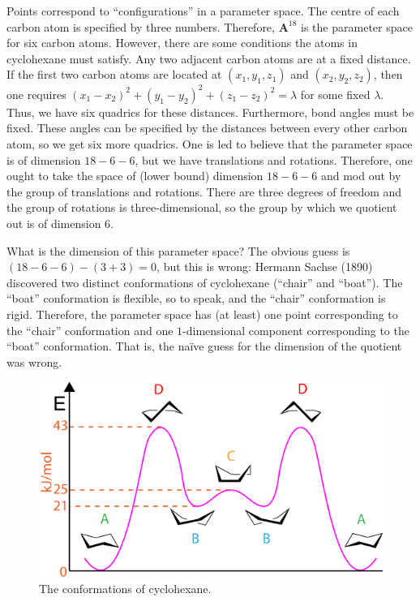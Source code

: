 \documentclass [11 pt, oneside] {article}
\begin{document}
\begin{example}\label{}
Points correspond to ``configurations'' in a parameter space. The centre of each carbon atom is specified by three numbers. Therefore, $\mathbf{A}^{18}$ is the parameter space for six carbon atoms. However, there are some conditions the atoms in cyclohexane must satisfy. Any two adjacent carbon atoms are at a fixed distance. If the first two carbon atoms are located at $(x_1,y_1,z_1)$ and $(x_2,y_2,z_2)$, then one requires $(x_1-x_2)^2 + (y_1-y_2)^2 + (z_1-z_2)^2=\lambda$ for some fixed $\lambda$. Thus, we have six quadrics for these distances. Furthermore, bond angles must be fixed. These angles can be specified by the distances between every other carbon atom, so we get six more quadrics. One is led to believe that the parameter space is of dimension $18-6-6$, but we have translations and rotations. Therefore, one ought to take the space of (lower bound) dimension $18-6-6$ and mod out by the group of translations and rotations. There are three degrees of freedom and the group of rotations is three-dimensional, so the group by which we quotient out is of dimension $6$. 

What is the dimension of this parameter space? The obvious guess is $ (18-6-6) - (3+3)=0$, but this is wrong: Hermann Sachse (1890) discovered two distinct conformations of cyclohexane (``chair'' and ``boat''). The ``boat'' conformation is flexible, so to speak, and the ``chair'' conformation is rigid. Therefore, the parameter space has (at least) one point corresponding to the ``chair'' conformation and one $1$-dimensional component corresponding to the ``boat'' conformation. That is, the na\"ive guess for the dimension of the quotient was wrong.
\end{example}
\iffalse
\begin{figure}
	\begin{center}
		\includegraphics[scale=0.5]{images/cyclohexane_conformations}
		\caption{The conformations of cyclohexane.}
	\end{center}
\end{figure}
\end{document}
